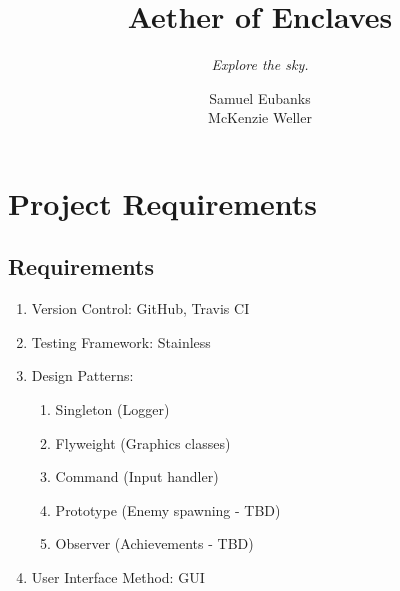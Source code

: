 \documentclass[a4paper]{scrreprt}
\title{Aether of Enclaves}
\subtitle{\textit{Explore the sky.}}
\author{
Samuel Eubanks\\
McKenzie Weller
}
\begin{document}
\maketitle

\tableofcontents


\chapter{Project Requirements}

\section{Requirements}
\begin{enumerate}
   \item Version Control: GitHub, Travis CI
   \item Testing Framework: Stainless
   \item Design Patterns:
   \begin{enumerate}
     \item Singleton (Logger)
     \item Flyweight (Graphics classes)
     \item Command (Input handler)
     \item Prototype (Enemy spawning - TBD)
     \item Observer (Achievements - TBD)
   \end{enumerate}
   \item User Interface Method: GUI
\end{enumerate}
\end{document}
